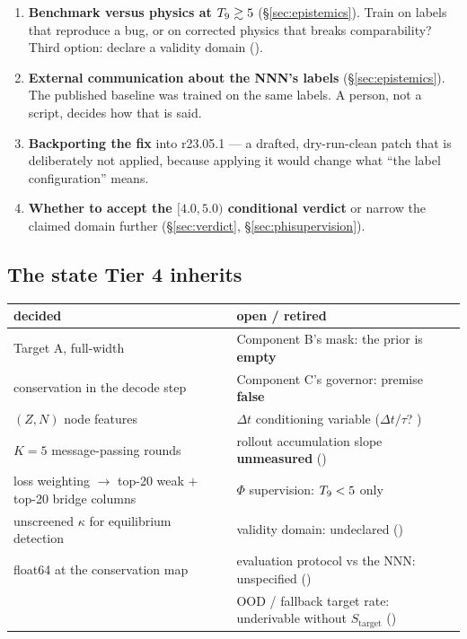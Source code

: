 \begin{enumerate}
\item \textbf{Benchmark versus physics at $T_{9} \gtrsim 5$}
  (\S\ref{sec:epistemics}). Train on labels that reproduce a bug, or on
  corrected physics that breaks comparability? Third option: declare a
  validity domain ().
\item \textbf{External communication about the NNN's labels}
  (\S\ref{sec:epistemics}). The published baseline was trained on the same
  labels. A person, not a script, decides how that is said.
\item \textbf{Backporting the  fix} into r23.05.1 --- a drafted,
  dry-run-clean patch that is deliberately not applied, because applying it
  would change what ``the label configuration'' means.
\item \textbf{Whether to accept the $[4.0, 5.0)$ conditional verdict} or
  narrow the claimed domain further (\S\ref{sec:verdict},
  \S\ref{sec:phisupervision}).
\end{enumerate}

\subsection{The state Tier 4 inherits}
\label{sec:inherits}

\begin{center}
\begin{tabularx}{\textwidth}{@{}L{6.4cm} Y@{}}
\toprule
\textbf{decided} & \textbf{open / retired} \\
\midrule
Target A, full-width & Component B's mask: the prior is \textbf{empty} \\
conservation in the decode step & Component C's governor: premise
  \textbf{false} \\
$(Z, N)$ node features & $\Delta t$ conditioning variable ($\Delta t/\tau$?
  ) \\
$K = 5$ message-passing rounds & rollout accumulation slope
  \textbf{unmeasured} () \\
loss weighting $\to$ top-20 weak $+$ top-20 bridge columns &
  $\Phi$ supervision: $T_{9} < 5$ only \\
unscreened $\kappa$ for equilibrium detection & validity domain: undeclared
  () \\
float64 at the conservation map & evaluation protocol vs the NNN: unspecified
  () \\
 & OOD / fallback target rate: underivable without $S_{\mathrm{target}}$
  () \\
\bottomrule
\end{tabularx}
\end{center}

